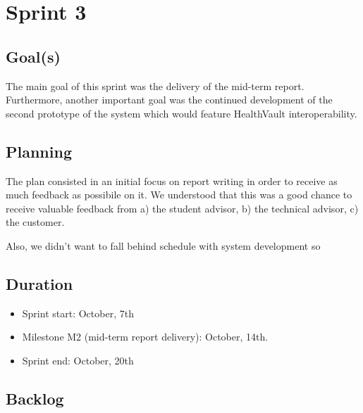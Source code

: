 

\chapter{Sprint 3}
\label{Sprint0}

\section{Goal(s)}

The main goal of this sprint was the delivery of the mid-term report.
Furthermore, another important goal was the continued development of the second prototype
of the system which would feature HealthVault interoperability.

\section{Planning}

The plan consisted in an initial focus on report writing in order to receive as much
feedback as possibile on it. We understood that this was a good chance to receive
valuable feedback from a) the student advisor, b) the technical advisor, c) the customer.

Also, we didn't want to fall behind schedule with system development so 


\section{Duration}

\begin{itemize}
\item Sprint start:  October, 7th
\item Milestone M2 (mid-term report delivery): October, 14th.
\item Sprint end: October, 20th
\end{itemize}

\section{Backlog}


